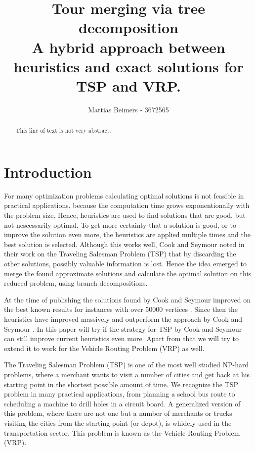 \documentclass[12pt]{article}
\title{Tour merging via tree decomposition \\ \vspace{2mm} \small{A hybrid approach between
heuristics and exact solutions for TSP and VRP.}}
\author{Mattias Beimers - 3672565}
\begin{document}
\maketitle

%
%
\begin{abstract}
    This line of text is not very abstract.
\end{abstract}



%
%
\section{Introduction}
\label{sec:introduction}
For many optimization problems calculating optimal solutions is not feasible in practical
applications, because the computation time grows exponentionally with the problem size. Hence,
heuristics are used to find solutions that are good, but not nescessarily optimal.
To get more certainty that a solution is good, or to improve the solution even more, the heuristics
are applied multiple times and the best solution is selected. Although this works well, Cook and
Seymour noted in their work \cite{cook-seymour} on the Traveling Salesman Problem (TSP) that by
discarding the other solutions, possibly valuable information is lost. Hence the idea emerged to
merge the found approximate solutions and calculate the optimal solution on this reduced problem,
using branch decompositions.

At the time of publishing the solutions found by Cook and Seymour improved on the best known results
for instances with over 50000 vertices \cite{is this even true???}. Since then the heuristics have
improved massively and outperform the approach by Cook and Seymour \cite{some LKH papers}.
In this paper will try if the strategy for TSP by Cook and Seymour can still improve current heuristics
even more. Apart from that we will try to extend it to work for the Vehicle Routing Problem (VRP) as
well.

The Traveling Salesman Problem (TSP) is one of the most well studied NP-hard problems, where a
merchant wants to visit a number of cities and get back at his starting point in the shortest
possible amount of time.
We recognize the TSP problem in many practical applications, from planning a school bus route to
scheduling a machine to drill holes in a circuit board.
A generalized version of this problem, where there are not one but a number of merchants or trucks
visiting the cities from the starting point (or depot), is whidely used in the transportation
sector. This problem is known as the Vehicle Routing Problem (VRP).
\end{document}
